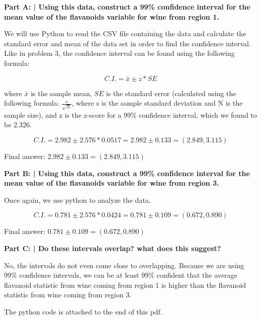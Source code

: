 \documentclass{article}
\begin{document}
 \textbf{Part A: | Using this data, construct a 99\% confidence interval for the mean value of the flavanoids variable for wine from region 1.}\newline
 
 We will use Python to read the CSV file containing the data and calculate the standard error and mean of the data set in order to find the confidence interval. Like in problem 3, the confidence interval can be found using the following formula:
 
 \[C.I. = \bar{x} \pm z*SE\]
 
 where $\bar{x}$ is the sample mean, $SE$ is the standard error (calculated using the following formula: $\frac{s}{\sqrt{N}}$, where s is the sample standard deviation and N is the sample size), and z is the z-score for a 99\% confidence interval, which we found to be 2.326.
 
 \[C.I. = 2.982 \pm 2.576*0.0517 = 2.982 \pm 0.133 = (2.849, 3.115)\]
 
 Final answer: $2.982 \pm 0.133 = (2.849, 3.115)$\newline
 
 \textbf{Part B: | Using this data, construct a 99\% confidence interval for the mean value of the flavanoids variable for wine from region 3.}\newline
 
 Once again, we use python to analyze the data.
 
 \[C.I. = 0.781 \pm 2.576*0.0424 = 0.781 \pm 0.109 = (0.672,0.890)\]
 
 Final answer: $0.781 \pm 0.109 = (0.672,0.890)$\newline
 
 \textbf{Part C: | Do these intervals overlap? what does this suggest?}\newline
 
 No, the intervals do not even come close to overlapping. Because we are using 99\% confidence intervals, we can be at least 99\% confident that the average flavanoid statistic from wine coming from region 1 is higher than the flavanoid statistic from wine coming from region 3.
 
 The python code is attached to the end of this pdf.\newline
 
 
\end{document}
